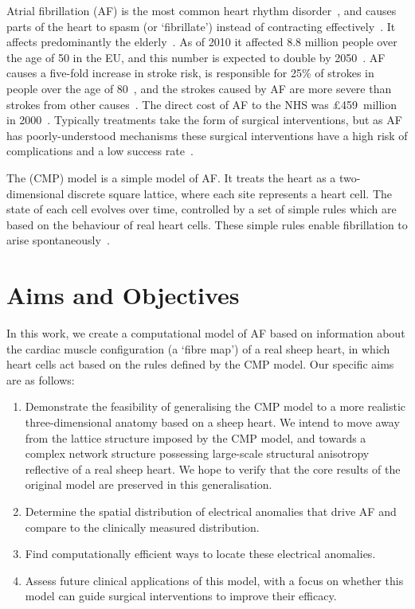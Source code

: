 Atrial fibrillation (AF) is the most common heart rhythm disorder~\cite{narayan2012treatment}, and causes parts of the heart to spasm (or `fibrillate') instead of contracting effectively~\cite{nattel}. It affects predominantly the elderly~\cite{wasmer2017predisposing}. As of 2010 it affected 8.8 million people over the age of 50 in the EU, and this number is expected to double by 2050~\cite{krijthe2013projections}. AF causes a five-fold increase in stroke risk, is responsible for 25\% of strokes in people over the age of 80~\cite{wolf1991probability}, and the strokes caused by AF are more severe than strokes from other causes~\cite{miller2005cost}. The direct cost of AF to the NHS was \pounds 459~million in 2000~\cite{stewart2004cost}. 
Typically treatments take the form of surgical interventions, but as AF has poorly-understood mechanisms these surgical interventions have a high risk of complications and a low success rate~\cite{deshmukh2013hospital, cappato2005worldwide}.

The \cmp (CMP) model is a simple model of AF. It treats the heart as a two-dimensional discrete square lattice, where each site represents a heart cell. The state of each cell evolves over time, controlled by a set of simple rules which are based on the behaviour of real heart cells. These simple rules enable fibrillation to arise spontaneously~\cite{cmp}.
	
\section{Aims and Objectives}

In this work, we create a computational model of AF based on information about the cardiac muscle configuration (a `fibre map') of a real sheep heart, in which heart cells act based on the rules defined by the CMP model. Our specific aims are as follows:
\begin{enumerate}
    \item Demonstrate the feasibility of generalising the CMP model to a more realistic three-dimensional anatomy based on a sheep heart. We intend to move away from the lattice structure imposed by the CMP model, and towards a complex network structure possessing large-scale structural anisotropy reflective of a real sheep heart. We hope to verify that the core results of the original model are preserved in this generalisation.
    \item Determine the spatial distribution of electrical anomalies that drive AF and compare to the clinically measured distribution.
    \item Find computationally efficient ways to locate these electrical anomalies.
    \item Assess future clinical applications of this model, with a focus on whether this model can guide surgical interventions to improve their efficacy.
\end{enumerate}


